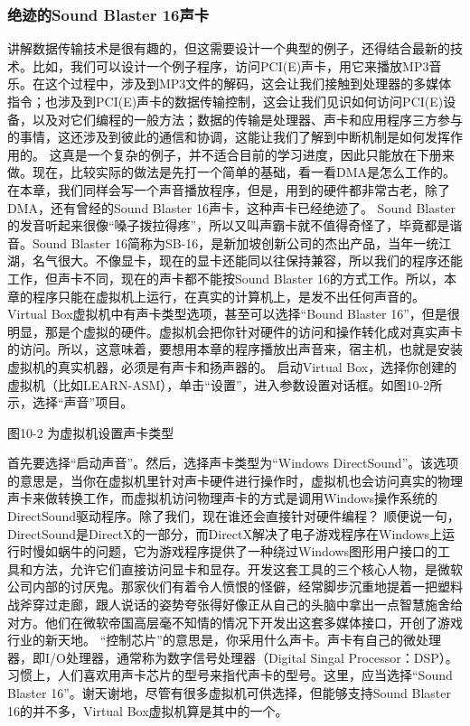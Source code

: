 \documentclass[12pt]{article}
\begin{document}
\begin{CJK}{UTF8}{gbsn}
\subsubsection{绝迹的Sound Blaster 16声卡}
讲解数据传输技术是很有趣的，但这需要设计一个典型的例子，还得结合最新的技术。比如，我们可以设计一个例子程序，访问PCI(E)声卡，用它来播放MP3音乐。在这个过程中，涉及到MP3文件的解码，这会让我们接触到处理器的多媒体指令；也涉及到PCI(E)声卡的数据传输控制，这会让我们见识如何访问PCI(E)设备，以及对它们编程的一般方法；数据的传输是处理器、声卡和应用程序三方参与的事情，这还涉及到彼此的通信和协调，这能让我们了解到中断机制是如何发挥作用的。
这真是一个复杂的例子，并不适合目前的学习进度，因此只能放在下册来做。现在，比较实际的做法是先打一个简单的基础，看一看DMA是怎么工作的。在本章，我们同样会写一个声音播放程序，但是，用到的硬件都非常古老，除了DMA，还有曾经的Sound Blaster 16声卡，这种声卡已经绝迹了。
Sound Blaster的发音听起来很像“嗓子拨拉得疼”，所以又叫声霸卡就不值得奇怪了，毕竟都是谐音。Sound Blaster 16简称为SB-16，是新加坡创新公司的杰出产品，当年一统江湖，名气很大。不像显卡，现在的显卡还能同以往保持兼容，所以我们的程序还能工作，但声卡不同，现在的声卡都不能按Sound Blaster 16的方式工作。所以，本章的程序只能在虚拟机上运行，在真实的计算机上，是发不出任何声音的。
Virtual Box虚拟机中有声卡类型选项，甚至可以选择“Bound Blaster 16”，但是很明显，那是个虚拟的硬件。虚拟机会把你针对硬件的访问和操作转化成对真实声卡的访问。所以，这意味着，要想用本章的程序播放出声音来，宿主机，也就是安装虚拟机的真实机器，必须是有声卡和扬声器的。
启动Virtual Box，选择你创建的虚拟机（比如LEARN-ASM），单击“设置”，进入参数设置对话框。如图10-2所示，选择“声音”项目。
 
图10-2  为虚拟机设置声卡类型

首先要选择“启动声音”。然后，选择声卡类型为“Windows DirectSound”。该选项的意思是，当你在虚拟机里针对声卡硬件进行操作时，虚拟机也会访问真实的物理声卡来做转换工作，而虚拟机访问物理声卡的方式是调用Windows操作系统的DirectSound驱动程序。除了我们，现在谁还会直接针对硬件编程？
顺便说一句，DirectSound是DirectX的一部分，而DirectX解决了电子游戏程序在Windows上运行时慢如蜗牛的问题，它为游戏程序提供了一种绕过Windows图形用户接口的工具和方法，允许它们直接访问显卡和显存。开发这套工具的三个核心人物，是微软公司内部的讨厌鬼。那家伙们有着令人愤恨的怪僻，经常脚步沉重地提着一把塑料战斧穿过走廊，跟人说话的姿势夸张得好像正从自己的头脑中拿出一点智慧施舍给对方。他们在微软帝国高层毫不知情的情况下开发出这套多媒体接口，开创了游戏行业的新天地。
“控制芯片”的意思是，你采用什么声卡。声卡有自己的微处理器，即I/O处理器，通常称为数字信号处理器（Digital Singal Processor：DSP）。习惯上，人们喜欢用声卡芯片的型号来指代声卡的型号。这里，应当选择“Sound Blaster 16”。谢天谢地，尽管有很多虚拟机可供选择，但能够支持Sound Blaster 16的并不多，Virtual Box虚拟机算是其中的一个。


\end{CJK}
\end{document}
